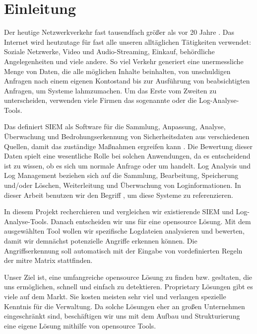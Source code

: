 \section{Einleitung}

Der heutige Netzwerkverkehr fast tausendfach größer als vor 20 Jahre \citep{Roser_I}. Das Internet wird heutzutage für fast alle unseren alltäglichen Tätigkeiten verwendet: Soziale Netzwerke, Video und Audio-Streaming, Einkauf, behördliche Angelegenheiten und viele andere. So viel Verkehr generiert eine unermessliche Menge von Daten, die alle möglichen Inhalte beinhalten, von unschuldigen Anfragen nach einem eigenen Kontostand bis zur Ausführung von beabsichtigten Anfragen, um Systeme lahmzumachen. Um das Erste vom Zweiten zu unterscheiden, verwenden viele Firmen das sogenannte  oder die Log-Analyse-Tools. 

Das  definiert \gls{SIEM} als Software für die Sammlung, Anpassung, Analyse, Überwachung und Bedrohungserkennung von Sicherheitsdaten aus verschiedenen Quellen, damit das zuständige   Maßnahmen ergreifen kann \citep{NIST_Definitions}. Die Bewertung dieser Daten spielt eine wesentliche Rolle bei solchen Anwendungen, da es entscheidend ist zu wissen, ob es sich um normale Anfrage oder um  handelt. Log Analysis und Log Management beziehen sich auf die Sammlung, Bearbeitung, Speicherung und/oder Löschen, Weiterleitung und Überwachung von Loginformationen. In dieser Arbeit benutzen wir den Begriff , um diese Systeme zu referenzieren.

In diesem Projekt recherchieren und vergleichen wir existierende \gls{SIEM} und Log-Analyse-Tools. Danach entscheiden wir uns für eine \gls{opensource} Lösung. Mit dem ausgewählten Tool wollen wir spezifische Logdateien analysieren und bewerten, damit wir demnächst potenzielle Angriffe erkennen können. Die Angriffserkennung soll automatisch mit der Eingabe von vordefinierten Regeln der \gls{mitre} Matrix stattfinden. 

\newpage
Unser Ziel ist, eine umfangreiche \gls{opensource} Lösung zu finden bzw. gesltaten, die uns ermöglichen,  schnell und einfach zu detektieren. \gls{Proprietary} Lösungen gibt es viele auf dem Markt. Sie kosten meisten sehr viel und verlangen spezielle Kenntnis für die Verwaltung. Da solche Lösungen eher an großen Unternehmen eingeschränkt sind, beschäftigen wir uns mit dem Aufbau und Strukturierung eine eigene Lösung mithilfe von \gls{opensource} Tools. 

